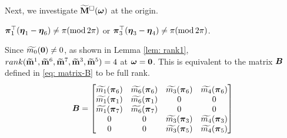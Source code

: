Next, we investigate $\widetilde{\mathbf{M}}^{\Box}(\boldsymbol{\omega})$ at the origin.
\begin{proposition}\label{prop: origin-det}
$\boldsymbol{\pi}_1^\top(\boldsymbol{\eta}_1-\boldsymbol{\eta}_6)\neq \pi(\text{mod}\,2\pi)$ or $\boldsymbol{\pi}_3^\top(\boldsymbol{\eta}_3-\boldsymbol{\eta}_4)\neq \pi(\text{mod}\,2\pi)$. 
\end{proposition}
 Since $\widetilde{m_0}(\boldsymbol{0})\neq 0$, as shown in Lemma \ref{lem: rank1}, $rank(\widetilde{\mathbf{m}}^{1},\widetilde{\mathbf{m}}^{6},\widetilde{\mathbf{m}}^{7},\widetilde{\mathbf{m}}^{3},\widetilde{\mathbf{m}}^{5})= 4$ at $\boldsymbol{\omega} = \boldsymbol{0}$. This is equivalent to the matrix $\boldsymbol{B}$ defined in \eqref{eq: matrix-B} to be full rank.
\begin{align}\label{eq: matrix-B}
\boldsymbol{B} = 
\begin{bmatrix}
& & & \\[-1em]
\widetilde{m_1}(\boldsymbol{\pi}_6) & \widetilde{m_6}(\boldsymbol{\pi}_6) & \widetilde{m_3}(\boldsymbol{\pi}_6) & \widetilde{m_4}(\boldsymbol{\pi}_6) \\
\widetilde{m_1}(\boldsymbol{\pi}_1) & \widetilde{m_6}(\boldsymbol{\pi}_1) & 0 & 0\\
\widetilde{m_1}(\boldsymbol{\pi}_7) & \widetilde{m_6}(\boldsymbol{\pi}_7) & 0 & 0\\
0 & 0 & \widetilde{m_3}(\boldsymbol{\pi}_3) & \widetilde{m_4}(\boldsymbol{\pi}_3)\\
0 & 0 & \widetilde{m_3}(\boldsymbol{\pi}_5) & \widetilde{m_4}(\boldsymbol{\pi}_5)\\
\end{bmatrix}
\end{align}
